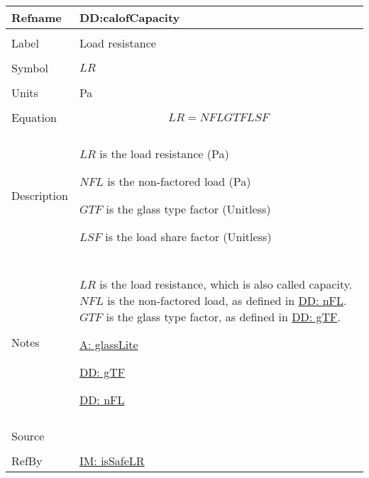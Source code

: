 \documentclass[12pt]{article}
\begin{document}
\vspace{\baselineskip}
\noindent
\begin{minipage}{\textwidth}
\begin{tabular}{>{\raggedright}p{}>{\raggedright\arraybackslash}p{}}
\toprule \textbf{Refname} & \textbf{DD:calofCapacity}
\label{DD:calofCapacity}
\\ \midrule \\
Label & Load resistance
        
\\ \midrule \\
Symbol & $LR$
         
\\ \midrule \\
Units & Pa
        
\\ \midrule \\
Equation & \begin{displaymath}
           LR=NFL GTF LSF
           \end{displaymath}
\\ \midrule \\
Description & \begin{symbDescription}
              \item{$LR$ is the load resistance (Pa)}
              \item{$NFL$ is the non-factored load (Pa)}
              \item{$GTF$ is the glass type factor (Unitless)}
              \item{$LSF$ is the load share factor (Unitless)}
              \end{symbDescription}
\\ \midrule \\
Notes & $LR$ is the load resistance, which is also called capacity. $NFL$ is the non-factored load, as defined in \hyperref[DD:nFL]{DD: nFL}. $GTF$ is the glass type factor, as defined in \hyperref[DD:gTF]{DD: gTF}.
        
        \hyperref[assumpGL]{A: glassLite}
        
        \hyperref[DD:gTF]{DD: gTF}
        
        \hyperref[DD:nFL]{DD: nFL}
        
\\ \midrule \\
Source & \cite{astm2009}
         
\\ \midrule \\
RefBy & \hyperref[IM:isSafeLR]{IM: isSafeLR}
        
\\ \bottomrule
\end{tabular}
\end{minipage}
\end{document}

